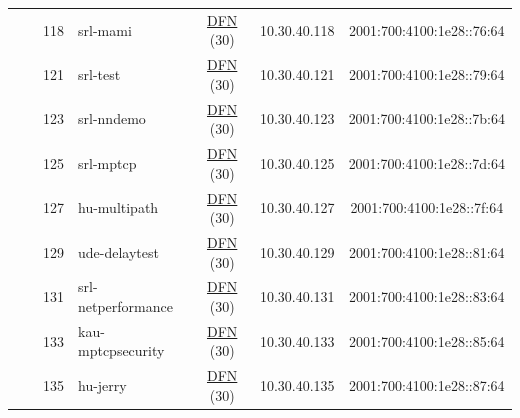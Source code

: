 \begin{small}
\begin{center}
\begin{longtable}{|c|c|c|c|c|c|c|c|}
  &  & \tiny{118} & \multicolumn{1}{|l|}{\tiny{srl-mami}} & \multicolumn{2}{|c|}{\tiny{\href{https://www.dfn.de}{DFN} (30)}} & \tiny{10.30.40.118} & \tiny{2001:700:4100:1e28::76:64} \\* \cline{3-3}\cline{4-4}\cline{5-5}\cline{6-6}\cline{7-7}\cline{8-8}
  &  & \tiny{121} & \multicolumn{1}{|l|}{\tiny{srl-test}} & \multicolumn{2}{|c|}{\tiny{\href{https://www.dfn.de}{DFN} (30)}} & \tiny{10.30.40.121} & \tiny{2001:700:4100:1e28::79:64} \\* \cline{3-3}\cline{4-4}\cline{5-5}\cline{6-6}\cline{7-7}\cline{8-8}
  &  & \tiny{123} & \multicolumn{1}{|l|}{\tiny{srl-nndemo}} & \multicolumn{2}{|c|}{\tiny{\href{https://www.dfn.de}{DFN} (30)}} & \tiny{10.30.40.123} & \tiny{2001:700:4100:1e28::7b:64} \\* \cline{3-3}\cline{4-4}\cline{5-5}\cline{6-6}\cline{7-7}\cline{8-8}
  &  & \tiny{125} & \multicolumn{1}{|l|}{\tiny{srl-mptcp}} & \multicolumn{2}{|c|}{\tiny{\href{https://www.dfn.de}{DFN} (30)}} & \tiny{10.30.40.125} & \tiny{2001:700:4100:1e28::7d:64} \\* \cline{3-3}\cline{4-4}\cline{5-5}\cline{6-6}\cline{7-7}\cline{8-8}
  &  & \tiny{127} & \multicolumn{1}{|l|}{\tiny{hu-multipath}} & \multicolumn{2}{|c|}{\tiny{\href{https://www.dfn.de}{DFN} (30)}} & \tiny{10.30.40.127} & \tiny{2001:700:4100:1e28::7f:64} \\* \cline{3-3}\cline{4-4}\cline{5-5}\cline{6-6}\cline{7-7}\cline{8-8}
  &  & \tiny{129} & \multicolumn{1}{|l|}{\tiny{ude-delaytest}} & \multicolumn{2}{|c|}{\tiny{\href{https://www.dfn.de}{DFN} (30)}} & \tiny{10.30.40.129} & \tiny{2001:700:4100:1e28::81:64} \\* \cline{3-3}\cline{4-4}\cline{5-5}\cline{6-6}\cline{7-7}\cline{8-8}
  &  & \tiny{131} & \multicolumn{1}{|l|}{\tiny{srl-netperformance}} & \multicolumn{2}{|c|}{\tiny{\href{https://www.dfn.de}{DFN} (30)}} & \tiny{10.30.40.131} & \tiny{2001:700:4100:1e28::83:64} \\* \cline{3-3}\cline{4-4}\cline{5-5}\cline{6-6}\cline{7-7}\cline{8-8}
  &  & \tiny{133} & \multicolumn{1}{|l|}{\tiny{kau-mptcpsecurity}} & \multicolumn{2}{|c|}{\tiny{\href{https://www.dfn.de}{DFN} (30)}} & \tiny{10.30.40.133} & \tiny{2001:700:4100:1e28::85:64} \\* \cline{3-3}\cline{4-4}\cline{5-5}\cline{6-6}\cline{7-7}\cline{8-8}
  &  & \tiny{135} & \multicolumn{1}{|l|}{\tiny{hu-jerry}} & \multicolumn{2}{|c|}{\tiny{\href{https://www.dfn.de}{DFN} (30)}} & \tiny{10.30.40.135} & \tiny{2001:700:4100:1e28::87:64} \\* \cline{3-3}\cline{4-4}\cline{5-5}\cline{6-6}\cline{7-7}\cline{8-8}

\end{longtable}
\end{center}
\end{small}
